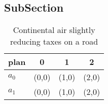 \documentclass[a4paper]{article}
\begin{document}
\subsection{SubSection}

\begin{table}
\begin{adjustbox}{width=0.6\columnwidth}
\begin{tabular}{|l|l|l|l|}
\hline
\textbf{plan} & \multicolumn{1}{c|}{\textbf{0}} & \multicolumn{1}{c|}{\textbf{1}} & \multicolumn{1}{c|}{\textbf{2}} \\ \hline
\textbf{$a_0$}  & (0,0) & (1,0) & (2,0) \\ \hline
\textbf{$a_1$}  & (0,0) & (1,0) & (2,0) \\ \hline
\end{tabular}
\end{adjustbox}
\caption{Continental air slightly reducing taxes on a road
}
\end{table}
\end{document}
